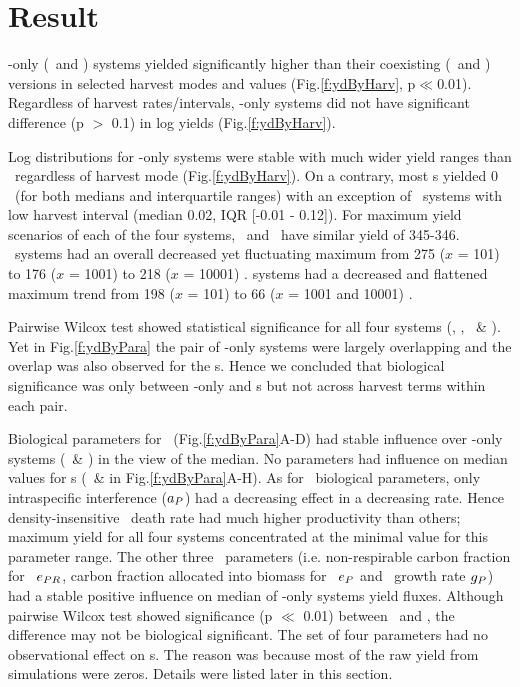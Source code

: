 \documentclass[../thesis.tex]{subfiles} %
\begin{document}
\section{Result}
\Phy-only (\PoH\ and \PoN) systems yielded significantly higher than their coexisting (\PBH\ and \PBN) versions in selected harvest modes and values (Fig.\ref{f:ydByHarv}, p$\ll$0.01).  Regardless of harvest rates/intervals, \phy-only systems did not have significant difference (p $>$ 0.1) in log yields (Fig.\ref{f:ydByHarv}).

Log distributions for \phy-only systems were stable with much wider yield ranges than \pbs\ regardless of harvest mode (Fig.\ref{f:ydByHarv}).  On a contrary, most \pbs s yielded 0 \dxdt\ (for both medians and interquartile ranges) with an exception of \PBN\ systems with low harvest interval (median 0.02, IQR [-0.01 - 0.12]\dxdt).  For maximum yield scenarios of each of the four systems, \PoH\ and \PoN\ have similar yield of 345-346\dxdt.  \PBH\ systems had an overall decreased yet fluctuating maximum from 275 ($x$ = 101) to 176 ($x$ = 1001) to 218 ($x$ = 10001) \dxdt.  \PBN systems had a decreased and flattened maximum trend from 198 ($x$ = 101) to 66 ($x$ = 1001 and 10001) \dxdt.

Pairwise Wilcox test showed statistical significance for all four systems (\PBH, \PoH, \PBN\ \& \PoN).  Yet in Fig.\ref{f:ydByPara} the pair of \phy-only systems were largely overlapping and the overlap was also observed for the \pbs s.  Hence we concluded that biological significance was only between \phy-only and \pbs s but not across harvest terms within each pair.

Biological parameters for \phy\ (Fig.\ref{f:ydByPara}A-D) had stable influence over \phy-only systems (\PoH\ \& \PoN) in the view of the median.  No parameters had influence on median values for \pbs s (\PBH\ \& \PBN in Fig.\ref{f:ydByPara}A-H).  As for \phy\ biological parameters, only intraspecific interference ($a_P$) had a decreasing effect in a decreasing rate.  Hence density-insensitive \phy\ death rate had much higher productivity than others; maximum yield for all four systems concentrated at the minimal value for this parameter range.  The other three \phy\ parameters (i.e. non-respirable carbon fraction for \phy\ $e_{PR}$, carbon fraction allocated into biomass for \phy\ $e_P$ and \phy\ growth rate $g_P$) had a stable positive influence on median of \phy-only systems yield fluxes.  Although pairwise Wilcox test showed significance (p $\ll$ 0.01) between \PoH\ and \PoN, the difference may not be biological significant.  The set of four parameters had no observational effect on \pbs s.  The reason was because most of the raw yield from simulations were zeros.  Details were listed later in this section.
\end{document}
